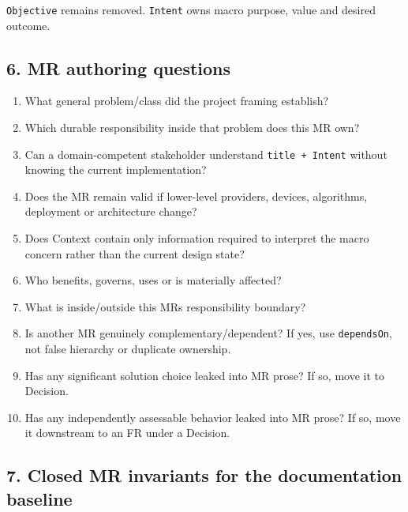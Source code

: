 \documentclass[
  10pt,
]{article}
\providecommand{\tightlist}{%
  \setlength{\itemsep}{0pt}\setlength{\parskip}{0pt}}
\begin{document}
\texttt{Objective} remains removed. \texttt{Intent} owns macro purpose,
value and desired outcome.

\subsection{6. MR authoring questions}\label{6-mr-authoring-questions}

\begin{enumerate}
\def\labelenumi{\arabic{enumi}.}
\tightlist
\item
  What general problem/class did the project framing establish?
\item
  Which durable responsibility inside that problem does this MR own?
\item
  Can a domain-competent stakeholder understand
  \texttt{title\ +\ Intent} without knowing the current implementation?
\item
  Does the MR remain valid if lower-level providers, devices,
  algorithms, deployment or architecture change?
\item
  Does Context contain only information required to interpret the macro
  concern rather than the current design state?
\item
  Who benefits, governs, uses or is materially affected?
\item
  What is inside/outside this MR\textquotesingle s responsibility
  boundary?
\item
  Is another MR genuinely complementary/dependent? If yes, use
  \texttt{dependsOn}, not false hierarchy or duplicate ownership.
\item
  Has any significant solution choice leaked into MR prose? If so, move
  it to Decision.
\item
  Has any independently assessable behavior leaked into MR prose? If so,
  move it downstream to an FR under a Decision.
\end{enumerate}

\subsection{7. Closed MR invariants for the documentation
baseline}\label{7-closed-mr-invariants-for-the-documentation-baseline}
\end{document}
